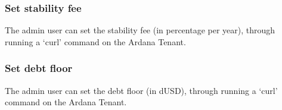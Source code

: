 \documentclass{article} %
\begin{document}
\subsubsection{Set stability fee}

The admin user can set the stability fee (in percentage per year), through
running a `curl' command on the Ardana Tenant.

\subsubsection{Set debt floor}

The admin user can set the debt floor (in dUSD), through running a `curl'
command on the Ardana Tenant.

%






% 

\end{document}
